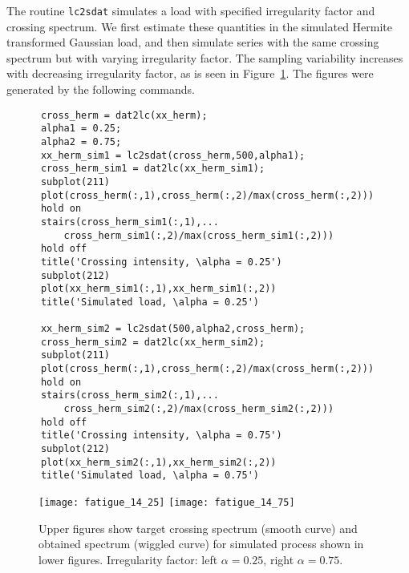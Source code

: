 The routine {\tt lc2sdat} simulates a load with specified irregularity factor 
and crossing spectrum. 
We first estimate these quantities in the
simulated Hermite transformed Gaussian load, and then simulate series with
the same crossing spectrum but with varying irregularity factor. The sampling
variability increases with decreasing irregularity factor, as is seen in
Figure~\ref{fig_wafo_6.9}. The figures were
generated by the following commands.
{\small\begin{verbatim}
      cross_herm = dat2lc(xx_herm);
      alpha1 = 0.25;
      alpha2 = 0.75;
      xx_herm_sim1 = lc2sdat(cross_herm,500,alpha1);
      cross_herm_sim1 = dat2lc(xx_herm_sim1);
      subplot(211)
      plot(cross_herm(:,1),cross_herm(:,2)/max(cross_herm(:,2)))
      hold on
      stairs(cross_herm_sim1(:,1),...
          cross_herm_sim1(:,2)/max(cross_herm_sim1(:,2)))
      hold off
      title('Crossing intensity, \alpha = 0.25')
      subplot(212)
      plot(xx_herm_sim1(:,1),xx_herm_sim1(:,2))
      title('Simulated load, \alpha = 0.25')

      xx_herm_sim2 = lc2sdat(500,alpha2,cross_herm);
      cross_herm_sim2 = dat2lc(xx_herm_sim2);
      subplot(211)
      plot(cross_herm(:,1),cross_herm(:,2)/max(cross_herm(:,2)))
      hold on
      stairs(cross_herm_sim2(:,1),...
          cross_herm_sim2(:,2)/max(cross_herm_sim2(:,2)))
      hold off
      title('Crossing intensity, \alpha = 0.75')
      subplot(212)
      plot(xx_herm_sim2(:,1),xx_herm_sim2(:,2))
      title('Simulated load, \alpha = 0.75')
\end{verbatim}}

\begin{figure}
  \centering
  \texttt{[image: fatigue\_14\_25]} \hspace{5mm}
  \texttt{[image: fatigue\_14\_75]}
\vspace{-3mm}
\caption[Target and obtained crossing spectrum for simulated process]{
Upper figures show target crossing spectrum (smooth curve)
  and obtained spectrum (wiggled curve) for simulated process shown in
  lower figures. Irregularity factor: left $\alpha=0.25$, right
  $\alpha=0.75$.}
\label{fig_wafo_6.9}
\end{figure}


